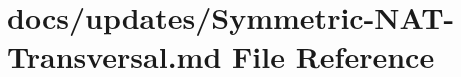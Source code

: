 \hypertarget{_symmetric-_n_a_t-_transversal_8md}{\section{docs/updates/\+Symmetric-\/\+N\+A\+T-\/\+Transversal.md File Reference}
\label{_symmetric-_n_a_t-_transversal_8md}
}
